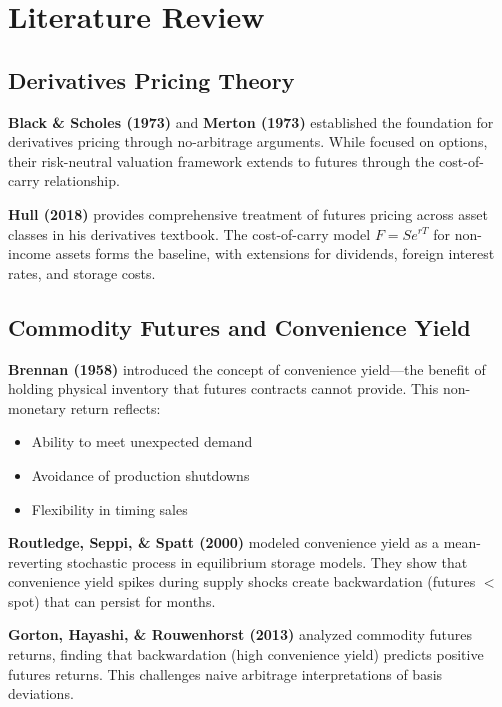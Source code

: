 \documentclass[12pt,a4paper]{article}
\begin{document}
\newpage
\section{Literature Review}

\subsection{Derivatives Pricing Theory}

\textbf{Black \& Scholes (1973)} and \textbf{Merton (1973)} established the foundation for derivatives pricing through no-arbitrage arguments. While focused on options, their risk-neutral valuation framework extends to futures through the cost-of-carry relationship.

\textbf{Hull (2018)} provides comprehensive treatment of futures pricing across asset classes in his derivatives textbook. The cost-of-carry model $F = S e^{rT}$ for non-income assets forms the baseline, with extensions for dividends, foreign interest rates, and storage costs.

\subsection{Commodity Futures and Convenience Yield}

\textbf{Brennan (1958)} introduced the concept of convenience yield—the benefit of holding physical inventory that futures contracts cannot provide. This non-monetary return reflects:
\begin{itemize}
    \item Ability to meet unexpected demand
    \item Avoidance of production shutdowns
    \item Flexibility in timing sales
\end{itemize}

\textbf{Routledge, Seppi, \& Spatt (2000)} modeled convenience yield as a mean-reverting stochastic process in equilibrium storage models. They show that convenience yield spikes during supply shocks create backwardation (futures $<$ spot) that can persist for months.

\textbf{Gorton, Hayashi, \& Rouwenhorst (2013)} analyzed commodity futures returns, finding that backwardation (high convenience yield) predicts positive futures returns. This challenges naive arbitrage interpretations of basis deviations.
\end{document}
